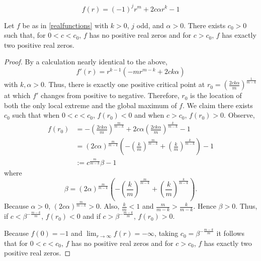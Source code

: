 \documentclass[10pt,a4paper]{amsart}
\begin{document}
\begin{equation}\label{realfunctions}
    f(r) = (-1)^j r^m +2 c \alpha r^k - 1
\end{equation}

\begin{lemma}\label{elilemma}
Let $f$ be as in \eqref{realfunctions} with $k>0$, $j$ odd, and $\alpha >0$.  There exists $c_0 > 0$ such that, for $0 < c < c_0$, $f$ has no positive real zeros and for $c > c_0$, $f$ has exactly two positive real zeros.
\end{lemma}

    \begin{proof}
    By a calculation nearly identical to the above,
    \[
    f'(r) = r^{k-1}\left(-m r^{m-k}+2 c k \alpha  \right)
    \]
     with $k,\alpha>0$.  Thus, there is exactly one positive critical point at $r_0 =\left({\frac{2c k\alpha }{m}}\right)^{\frac{1}{m-k}}$ at which $f'$ changes from positive to negative. Therefore, $r_0$ is the location of both the only local extreme and the global maximum of $f$.  We claim there exists $c_0$ such that when $0 < c < c_0$, $f(r_0) < 0$ and when $c > c_0$, $f(r_0) > 0$. Observe,
    \begin{align*}
    f(r_0) &= -\left( \frac{2c k\alpha }{m} \right)   ^ {\frac{m}{m-k}}  + 2c\alpha \left( \frac{2c k\alpha }{m}   \right) ^ \frac{k}{m-k} - 1 \\
    &= \left(2c\alpha\right)^{\frac{m}{m-k}} \left( -\left(\frac{k}{m}\right) ^ {\frac{m}{m-k}} +  \left( \frac{k}{m} \right) ^ {\frac{k}{m-k}} \right) -1\\
    &:=c^{\frac{m}{m-k}}\beta - 1
    \end{align*}
    where 
    \[
    \beta = \left(2\alpha\right)^{\frac{m}{m-k}} \left( -\left(\frac{k}{m}\right) ^ {\frac{m}{m-k}} +  \left( \frac{k}{m} \right)^{\frac{k}{m-k}} \right).
    \]
    Because $\alpha >0$, $\left(2c\alpha\right)^{\frac{m}{m-k}} > 0$. Also, $\frac{k}{m} < 1$ and $\frac{m}{m-k} > \frac{k}{m-k}$. Hence $\beta >0$.  Thus, if $c < \beta^{-\frac{m-k}{m}}$, $f(r_0) < 0$ and if  $c > \beta^{-\frac{m-k}{m}}$, $f(r_0) > 0$. 
    
    Because $f(0)=-1$ and $\lim_{r \to \infty} f(r) = -\infty$, taking $c_0=\beta^{-\frac{m-k}{m}}$ it follows that for $0<c<c_0$, $f$ has no positive real zeros and for $c>c_0$, $f$ has exactly two positive real zeros. 
    \end{proof}
\end{document}
